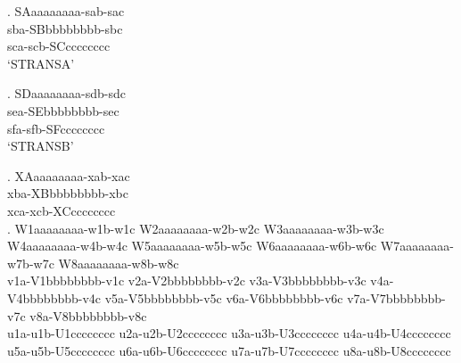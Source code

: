 

\GlossMorphAlign

{\GlossTransSide
\ex. \glll SAaaaaaaaa-sab-sac \\
           sba-SBbbbbbbbb-sbc \\
           sca-scb-SCcccccccc \\
     \glt `STRANSA'

}

{\GlossTransSide\GlossMorphAlignOff
\ex. \glll SDaaaaaaaa-sdb-sdc \\
           sea-SEbbbbbbbb-sec \\
           sfa-sfb-SFcccccccc \\
     \glt `STRANSB'

}

\ex. \glll XAaaaaaaaa-xab-xac\exannot{[XANNOT]} \\
           xba-XBbbbbbbbb-xbc \\
           xca-xcb-XCcccccccc \\

\ex. \glll W1aaaaaaaa-w1b-w1c W2aaaaaaaa-w2b-w2c W3aaaaaaaa-w3b-w3c
           W4aaaaaaaa-w4b-w4c W5aaaaaaaa-w5b-w5c W6aaaaaaaa-w6b-w6c
           W7aaaaaaaa-w7b-w7c W8aaaaaaaa-w8b-w8c \\
           v1a-V1bbbbbbbb-v1c v2a-V2bbbbbbbb-v2c v3a-V3bbbbbbbb-v3c
           v4a-V4bbbbbbbb-v4c v5a-V5bbbbbbbb-v5c v6a-V6bbbbbbbb-v6c
           v7a-V7bbbbbbbb-v7c v8a-V8bbbbbbbb-v8c \\
           u1a-u1b-U1cccccccc u2a-u2b-U2cccccccc u3a-u3b-U3cccccccc
           u4a-u4b-U4cccccccc u5a-u5b-U5cccccccc u6a-u6b-U6cccccccc
           u7a-u7b-U7cccccccc u8a-u8b-U8cccccccc \\


